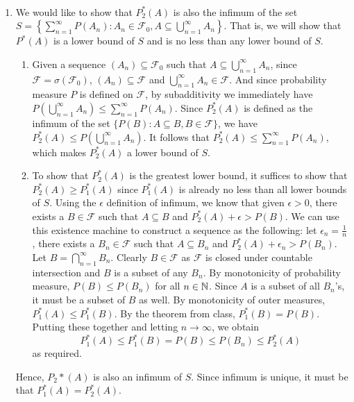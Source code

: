 \documentclass[12pt]{article}
\begin{document}
\begin{problem}[5]
~\begin{enumerate}[label=\alph*)]
	\item We would like to show that $P_2^*(A)$ is also the infimum of the set $S=\left\{ \sum_{ n=1}^{\infty} P(A_n):A_n \in \mathcal{F}_0, A \subseteq \bigcup_{n =1}^{\infty} A_n \right\} $. That is, we will show that $P^* (A)$ is a lower bound of $S$ and is no less than any lower bound of  $S$.
		 \begin{enumerate}[label=\arabic*)]
			 \item Given a sequence $(A_n) \subseteq \mathcal{F}_0$ such that $A \subseteq \bigcup_{n =1}^{\infty} A_n$, since $\mathcal{F} = \sigma(\mathcal{F}_0)$, $(A_n) \subseteq \mathcal{F}$ and $\bigcup_{n =1}^{\infty} A_n \in \mathcal{F} $. And since probability measure $P$ is defined on  $\mathcal{F}$, by subadditivity we immediately have $P\left( \bigcup_{n =1}^{\infty} A_n \right) \leq \sum_{ n=1}^{\infty} P(A_n)$. Since $P_2^* (A)$ is defined as the infimum of the set $\{P(B):A \subseteq B, B \in \mathcal{F}\} $, we have $P_2^* (A) \leq P\left( \bigcup_{n =1}^{\infty} A_n \right) $. It follows that $P_2^* (A) \leq \sum_{ n=1}^{\infty} P(A_n)$, which makes $P_2^* (A)$ a lower bound of $S$.
			 \item To show that $P_2^* (A)$ is the greatest lower bound, it suffices to show that $P_2^* (A) \geq P_1^* (A)$ since $P_1^* (A)$ is already no less than all lower bounds of $S$. Using the $\epsilon$ definition of infimum, we know that given $\epsilon>0$, there exists a $B \in \mathcal{F}$ such that $A \subseteq B$ and $P_2^* (A) +\epsilon > P(B) $. We can use this existence machine to construct a sequence as the following: let $\epsilon_n = \frac{1}{n}$, there exists a $B_n \in \mathcal{F}$ such that $A \subseteq B_n$ and $P_2^* (A) +\epsilon_n> P(B_n)$. Let $B = \bigcap_{n =1}^{\infty} B_n$. Clearly $B \in \mathcal{F}$ as $\mathcal{F}$ is closed under countable intersection and $B$ is a subset of any  $B_n$. By monotonicity of probability measure, $P(B) \leq P(B_n)$ for all $n \in \mathbb{N}$. Since $A$ is a subset of all $B_n$'s, it must be a subset of $B$ as well. By monotonicity of outer measures, $P_1^* (A) \leq P_1^* (B)$. By the theorem from class, $P_1^* (B) = P(B)$. Putting these together and letting $n \to \infty$, we obtain
				 \[
					 P_1^* (A) \leq P_1^* (B) = P(B) \leq P(B_n) \leq P_2^* (A)
				 \]
				 as required.
		\end{enumerate}
		Hence, $P_2*(A)$ is also an infimum of  $S$. Since infimum is unique, it must be that  $P_1^* (A) = P_2^* (A)$.

\end{enumerate}
\end{problem}
\end{document}
